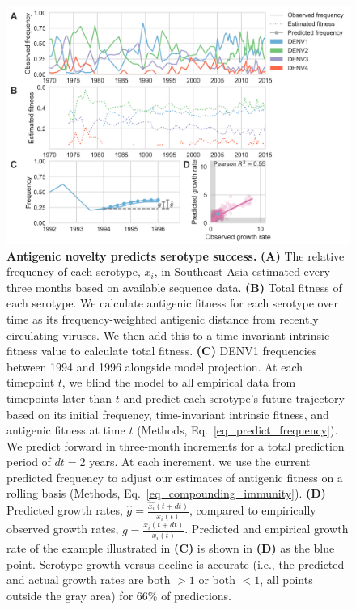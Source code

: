 \documentclass[11pt,oneside,letterpaper]{article}
\begin{document}
\begin{figure}[ht]
  \begin{centering}
    \includegraphics[width=\linewidth]{../figures/png/serotype_fitness_model.png}
  	\caption{\textbf{Antigenic novelty predicts serotype success.}
    \textbf{(A)} The relative frequency of each serotype, $x_i$, in Southeast Asia estimated every three months based on available sequence data.
    \textbf{(B)} Total fitness of each serotype. We calculate antigenic fitness for each serotype over time as its frequency-weighted antigenic distance from recently circulating viruses.
    We then add this to a time-invariant intrinsic fitness value to calculate total fitness.
    \textbf{(C)} DENV1 frequencies between 1994 and 1996 alongside model projection.
    At each timepoint $t$, we blind the model to all empirical data from timepoints later than $t$ and predict each serotype's future trajectory based on its initial frequency, time-invariant intrinsic fitness, and antigenic fitness at time $t$ (Methods, Eq.~\ref{eq_predict_frequency}).
    We predict forward in three-month increments for a total prediction period of $dt = 2$ years.
    At each increment, we use the current predicted frequency to adjust our estimates of antigenic fitness on a rolling basis (Methods, Eq.~\ref{eq_compounding_immunity}).
    \textbf{(D)} Predicted growth rates, $\hat{g} = \frac{\hat{x_i}(t+dt)}{x_i(t)}$, compared to empirically observed growth rates, $g = \frac{x_i(t+dt)}{x_i(t)}$.
    Predicted and empirical growth rate of the example illustrated in \textbf{(C)} is shown in \textbf{(D)} as the blue point.
    Serotype growth versus decline is accurate (i.e., the predicted and actual growth rates are both $>1$ or both $<1$, all points outside the gray area) for 66\% of predictions.
    }
  	\label{serotype_fitness_model}
  \end{centering}
\end{figure}
\end{document}
